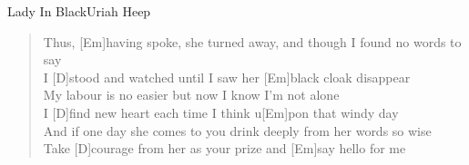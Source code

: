 \begin{song}{Lady In Black}{Uriah Heep}

    \begin{verse}  
        Thus, [Em]having spoke, she turned away, and though I found no words to say \\
        I [D]stood and watched until I saw her [Em]black cloak disappear \\
        My labour is no easier but now I know I'm not alone \\
        I [D]find new heart each time I think u[Em]pon that windy day \\
        And if one day she comes to you drink deeply from her words so wise \\
        Take [D]courage from her as your prize and [Em]say hello for me
    \end{verse}  


\end{song}
